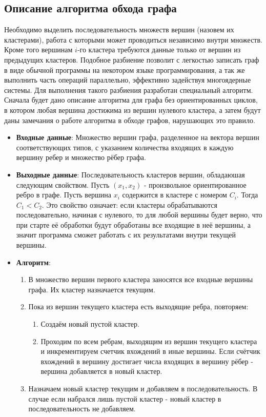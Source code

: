 \subsection{Описание алгоритма обхода графа}
\label{sec:algtraverse}
Необходимо выделить последовательность множеств вершин (назовем их кластерами), работа с которыми может проводиться независимо внутри множеств. Кроме того вершинам $i$-го кластера требуются данные только от вершин из предыдущих кластеров. Подобное разбиение позволит с легкостью записать граф в виде обычной программы на некотором языке программирования, а так же выполнить часть операций параллельно, эффективно задействуя многоядерные системы. Для выполнения такого разбиения разработан специальный алгоритм. Сначала будет дано описание алгоритма для графа без ориентированных циклов, в котором любая вершина достижима из вершин нулевого кластера, а затем будут даны замечания о работе алгоритма в обходе графов, нарушающих это правило.
\begin{itemize}
	\item \textbf{Входные данные}: Множество вершин графа, разделенное на вектора вершин соответствующих типов, с указанием количества входящих в каждую вершину ребер и множество рёбер графа.
	\item \textbf{Выходные данные}: Последовательность кластеров вершин, обладаюшая следующим свойством. Пусть $(x_1, x_2)$ - произвольное ориентированное ребро в графе. Пусть вершина $x_i$ содержится в кластере с номером $C_i$. Тогда $C_1 < C_2$. Это свойство означает: если кластеры обрабатываются последовательно, начиная с нулевого, то для любой вершины будет верно, что при старте её обработки будут обработаны все входящие в неё вершины, а значит программа сможет работать с их результатами внутри текущей вершины.
	\item \textbf{Алгоритм}: \begin{enumerate}
	    \item В множество вершин первого кластера заносятся все входные вершины графа. Их кластер назначается текущим.
	    \item Пока из вершин текущего кластера есть выходящие ребра, повторяем:
	    \begin{enumerate}
		\item Создаём новый пустой кластер.
	        \item Проходим по всем ребрам, выходящим из вершин текущего кластера и инкрементируем счетчик вхождений в иные вершины. Если счётчик вхождений в вершину достигает числа входящих в вершину рёбер - вершина добавляется в новый кластер.
	    \end{enumerate}
	        \item Назначаем новый кластер текущим и добавляем в последовательность. В случае если набрался лишь пустой кластер - новый кластер в последовательность не добавляем.
	\end{enumerate}
\end{itemize}

